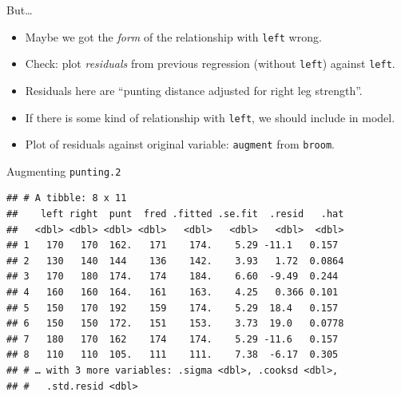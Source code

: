 \documentclass[ignorenonframetext,]{beamer}
\newenvironment{Shaded}{\begin{snugshade}}{\end{snugshade}}
\newcommand{\DecValTok}[1]{\textcolor[rgb]{0.00,0.00,0.81}{#1}}
\newcommand{\FloatTok}[1]{\textcolor[rgb]{0.00,0.00,0.81}{#1}}
\newcommand{\KeywordTok}[1]{\textcolor[rgb]{0.13,0.29,0.53}{\textbf{#1}}}
\newcommand{\NormalTok}[1]{#1}
\newcommand{\OperatorTok}[1]{\textcolor[rgb]{0.81,0.36,0.00}{\textbf{#1}}}
\newcommand{\StringTok}[1]{\textcolor[rgb]{0.31,0.60,0.02}{#1}}
\begin{document}
\begin{frame}[fragile]{But\ldots}
\protect\hypertarget{but}{}

\begin{itemize}
\item
  Maybe we got the \emph{form} of the relationship with \texttt{left}
  wrong.
\item
  Check: plot \emph{residuals} from previous regression (without
  \texttt{left}) against \texttt{left}.
\item
  Residuals here are ``punting distance adjusted for right leg
  strength''.
\item
  If there is some kind of relationship with \texttt{left}, we should
  include in model.
\item
  Plot of residuals against original variable: \texttt{augment} from
  \texttt{broom}.
\end{itemize}

\end{frame}

\begin{frame}[fragile]{Augmenting \texttt{punting.2}}
\protect\hypertarget{augmenting-punting.2}{}

\begin{Shaded}
\end{Shaded}

\begin{verbatim}
## # A tibble: 8 x 11
##    left right  punt  fred .fitted .se.fit  .resid   .hat
##   <dbl> <dbl> <dbl> <dbl>   <dbl>   <dbl>   <dbl>  <dbl>
## 1   170   170  162.   171    174.    5.29 -11.1   0.157 
## 2   130   140  144    136    142.    3.93   1.72  0.0864
## 3   170   180  174.   174    184.    6.60  -9.49  0.244 
## 4   160   160  164.   161    163.    4.25   0.366 0.101 
## 5   150   170  192    159    174.    5.29  18.4   0.157 
## 6   150   150  172.   151    153.    3.73  19.0   0.0778
## 7   180   170  162    174    174.    5.29 -11.6   0.157 
## 8   110   110  105.   111    111.    7.38  -6.17  0.305 
## # … with 3 more variables: .sigma <dbl>, .cooksd <dbl>,
## #   .std.resid <dbl>
\end{verbatim}

\end{frame}
\end{document}
